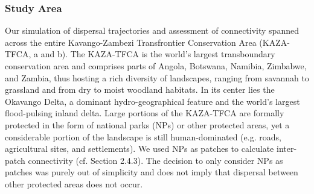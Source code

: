 \documentclass[abstract=on,10pt,a4paper,bibliography=totocnumbered]{article}
\begin{document}

\subsubsection{Study Area}
Our simulation of dispersal trajectories and assessment of connectivity spanned
across the entire Kavango-Zambezi Transfrontier Conservation Area (KAZA-TFCA,
a and b). The KAZA-TFCA is the world's largest transboundary
conservation area and comprises parts of Angola, Botswana, Namibia, Zimbabwe,
and Zambia, thus hosting a rich diversity of landscapes, ranging from savannah
to grassland and from dry to moist woodland habitats. In its center lies the
Okavango Delta, a dominant hydro-geographical feature and the world's largest
flood-pulsing inland delta. Large portions of the KAZA-TFCA are formally
protected in the form of national parks (NPs) or other protected areas, yet a
considerable portion of the landscape is still human-dominated (e.g. roads,
agricultural sites, and settlements). We used NPs as patches to calculate
inter-patch connectivity (cf. Section 2.4.3). The decision to only consider NPs
as patches was purely out of simplicity and does not imply that dispersal
between other protected areas does not occur.
\end{document}
